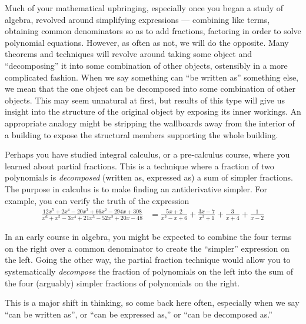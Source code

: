 \begin{para}Much of your mathematical upbringing, especially once you began a study of algebra, revolved around simplifying expressions --- combining like terms, obtaining common denominators so as to add fractions, factoring in order to solve polynomial equations.  However, as often as not, we will do the opposite.  Many theorems and techniques will revolve around taking some object and ``decomposing'' it into some combination of other objects, ostensibly in a more complicated fashion.  When we say something can ``be written as'' something else, we mean that the one object can be decomposed into some combination of other objects.  This may seem unnatural at first, but results of this type will give us insight into the structure of the original object by exposing its inner workings.  An appropriate analogy might be stripping the wallboards away from the interior of a building to expose the structural members supporting the whole building.\end{para}
%
\begin{para}Perhaps you have studied integral calculus, or a pre-calculus course, where you learned about partial fractions.  This is a technique where a fraction of two polynomials is {\em decomposed} (written as, expressed as) a sum of simpler fractions.  The purpose in calculus is to make finding an antiderivative simpler.  For example, you can verify the truth of the expression
%
\begin{align*}
\frac{{12 {x}^{5} } + {2 {x}^{4} } - {20 {x}^{3} } + {66 {x}^{2} } -{294 x} + 308}
{{x}^{6}  + {x}^{5}  - {3 {x}^{4} } + {21 {x}^{3} } - {52{x}^{2} } + {20 x} - 48}
&=
\frac{{5 x} + 2}{{x}^{2} - x + 6} +
\frac{{3 x} - 7}{{x}^{2}  + 1} +
\frac{3}{x + 4} +
\frac{1}{x - 2}
\end{align*}\end{para}
%
\begin{para}In an early course in algebra, you might be expected to combine the four terms on the right over a common denominator to create the ``simpler'' expression on the left.  Going the other way, the partial fraction technique would allow you to systematically {\em decompose} the fraction of polynomials on the left into the sum of the four (arguably) simpler fractions of polynomials on the right.\end{para}
%
\begin{para}This is a major shift in thinking, so come back here often, especially when we say ``can be written as'', or ``can be expressed as,'' or ``can be decomposed as.''\end{para}
